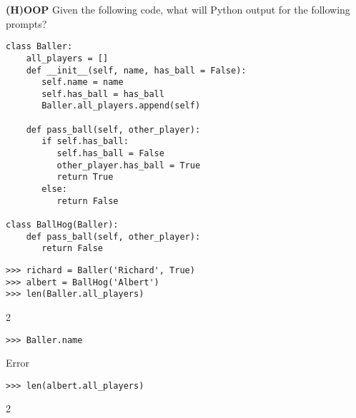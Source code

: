 \begin{blocksection}
\question \textbf{(H)OOP} \newline
Given the following code, what will Python output for the following prompts?

\begin{lstlisting}
class Baller:
    all_players = []
    def __init__(self, name, has_ball = False):
       self.name = name
       self.has_ball = has_ball
       Baller.all_players.append(self)

    def pass_ball(self, other_player):
       if self.has_ball:
          self.has_ball = False
          other_player.has_ball = True
          return True
       else:
          return False

class BallHog(Baller):
    def pass_ball(self, other_player):
       return False

\end{lstlisting}
\end{blocksection}
\begin{blocksection}

\begin{lstlisting}
>>> richard = Baller('Richard', True)
>>> albert = BallHog('Albert')
>>> len(Baller.all_players)
\end{lstlisting}
\begin{solution}[.2in]
2
\end{solution}

\begin{lstlisting}
>>> Baller.name
\end{lstlisting}
\begin{solution}[.2in]
Error
\end{solution}

\begin{lstlisting}
>>> len(albert.all_players)
\end{lstlisting}
\begin{solution}[.2in]
2
\end{solution}
\end{blocksection}

